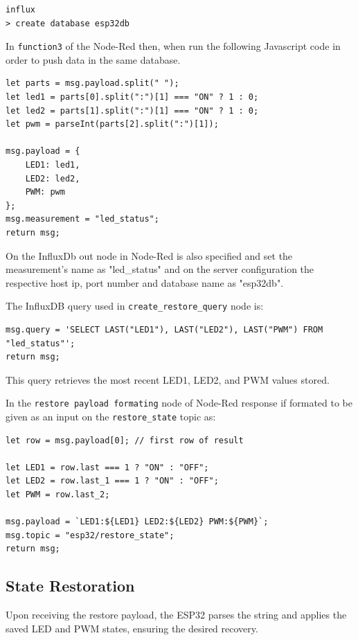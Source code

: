 \documentclass[a4paper,12pt]{article}
\begin{document}
{\scriptsize
\begin{verbatim}
influx
> create database esp32db
\end{verbatim}
}

In \texttt{function3} of the Node-Red then, when run the following 
Javascript code in order to push data in the same database.

{\scriptsize
\begin{verbatim}
let parts = msg.payload.split(" ");
let led1 = parts[0].split(":")[1] === "ON" ? 1 : 0;
let led2 = parts[1].split(":")[1] === "ON" ? 1 : 0;
let pwm = parseInt(parts[2].split(":")[1]);

msg.payload = {
    LED1: led1,
    LED2: led2,
    PWM: pwm
};
msg.measurement = "led_status";
return msg;
\end{verbatim}
}

On the InfluxDb out node in Node-Red is also specified and set
the measurement's name as "led\_status" and 
on the server configuration the
respective host ip, port number and database name as "esp32db".



The InfluxDB query used in \texttt{create\_restore\_query} node is:

{\scriptsize
\begin{verbatim}
msg.query = 'SELECT LAST("LED1"), LAST("LED2"), LAST("PWM") FROM "led_status"';
return msg;
\end{verbatim}
}
This query retrieves the most recent LED1, LED2, and PWM values stored.

In the \texttt{restore payload formating} node of Node-Red
response if formated to be given as an input on the \texttt{restore\_state} topic as:

{\scriptsize
\begin{verbatim}
let row = msg.payload[0]; // first row of result

let LED1 = row.last === 1 ? "ON" : "OFF";
let LED2 = row.last_1 === 1 ? "ON" : "OFF";
let PWM = row.last_2;

msg.payload = `LED1:${LED1} LED2:${LED2} PWM:${PWM}`;
msg.topic = "esp32/restore_state";
return msg;
\end{verbatim}
}

\subsection{State Restoration}

Upon receiving the restore payload, the ESP32 parses the string and applies the saved LED and PWM states, 
ensuring the desired recovery.
\end{document}
